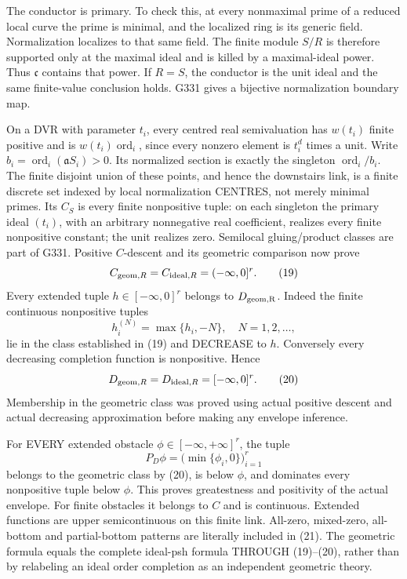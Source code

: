\documentclass[11pt]{article}
\begin{document}
The conductor is primary. To check this, at every nonmaximal prime of a reduced local curve the prime is minimal, and the localized ring is its generic field. Normalization localizes to that same field. The finite module \(S/R\) is therefore supported only at the maximal ideal and is killed by a maximal-ideal power. Thus \(\mathfrak c\) contains that power. If \(R=S\), the conductor is the unit ideal and the same finite-value conclusion holds. G331 gives a bijective normalization boundary map.

On a DVR with parameter \(t_i\), every centred real semivaluation has \(w(t_i)\) finite positive and is \(w(t_i)\operatorname{ord}_i\), since every nonzero element is \(t_i^d\) times a unit. Write \(b_i=\operatorname{ord}_i(\mathfrak aS_i)>0\). Its normalized section is exactly the singleton \(\operatorname{ord}_i/b_i\). The finite disjoint union of these points, and hence the downstairs link, is a finite discrete set indexed by local normalization CENTRES, not merely minimal primes. Its \(C_S\) is every finite nonpositive tuple: on each singleton the primary ideal \((t_i)\), with an arbitrary nonnegative real coefficient, realizes every finite nonpositive constant; the unit realizes zero. Semilocal gluing/product classes are part of G331. Positive \(C\)-descent and its geometric comparison now prove
\[
C_{{\rm geom},R}=C_{{\rm ideal},R}=(-\infty,0]^r. \tag{19}
\]
Every extended tuple \(h\in[-\infty,0]^r\) belongs to \(D_{\rm geom,R}\). Indeed the finite continuous nonpositive tuples
\[
h^{(N)}_i=\max\{h_i,-N\},\quad N=1,2,\ldots,
\]
lie in the class established in (19) and DECREASE to \(h\). Conversely every decreasing completion function is nonpositive. Hence
\[
D_{{\rm geom},R}=D_{{\rm ideal},R}=[-\infty,0]^r. \tag{20}
\]
Membership in the geometric class was proved using actual positive descent and actual decreasing approximation before making any envelope inference.

For EVERY extended obstacle \(\phi\in[-\infty,+\infty]^r\), the tuple
\[
P_D\phi=\bigl(\min\{\phi_i,0\}\bigr)_{i=1}^r \tag{21}
\]
belongs to the geometric class by (20), is below \(\phi\), and dominates every nonpositive tuple below \(\phi\). This proves greatestness and positivity of the actual envelope. For finite obstacles it belongs to \(C\) and is continuous. Extended functions are upper semicontinuous on this finite link. All-zero, mixed-zero, all-bottom and partial-bottom patterns are literally included in (21). The geometric formula equals the complete ideal-psh formula THROUGH (19)--(20), rather than by relabeling an ideal order completion as an independent geometric theory.
\end{document}
